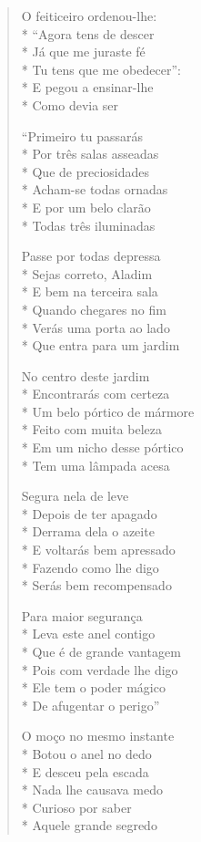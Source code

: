\begin{verse}
O feiticeiro ordenou-lhe:\\*
``Agora tens de descer\\*
Já que me juraste fé\\*
Tu tens que me obedecer'':\\*
E pegou a ensinar-lhe\\*
Como devia ser

``Primeiro tu passarás\\*
Por três salas asseadas\\*
Que de preciosidades\\*
Acham-se todas ornadas\\*
E por um belo clarão\\*
Todas três iluminadas

Passe por todas depressa\\*
Sejas correto, Aladim\\*
E bem na terceira sala\\*
Quando chegares no fim\\*
Verás uma porta ao lado\\*
Que entra para um jardim

No centro deste jardim\\*
Encontrarás com certeza\\*
Um belo pórtico de mármore\\*
Feito com muita beleza\\*
Em um nicho desse pórtico\\*
Tem uma lâmpada acesa

Segura nela de leve\\*
Depois de ter apagado\\*
Derrama dela o azeite\\*
E voltarás bem apressado\\*
Fazendo como lhe digo\\*
Serás bem recompensado

Para maior segurança\\*
Leva este anel contigo\\*
Que é de grande vantagem\\*
Pois com verdade lhe digo\\*
Ele tem o poder mágico\\*
De afugentar o perigo''

O moço no mesmo instante\\*
Botou o anel no dedo\\*
E desceu pela escada\\*
Nada lhe causava medo\\*
Curioso por saber\\*
Aquele grande segredo


\end{verse}
